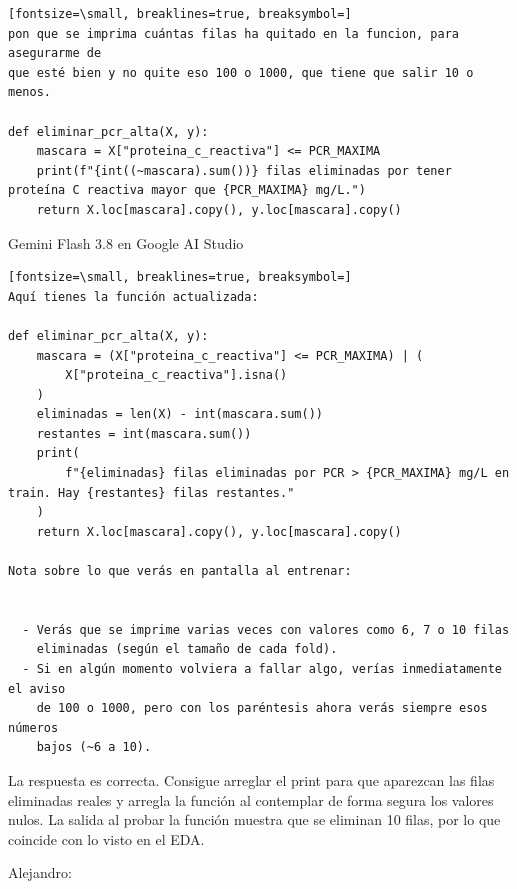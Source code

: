 \documentclass[12pt,a4paper,oneside]{book}
\begin{document}
\begin{iaprompt}
\begin{Verbatim}[fontsize=\small, breaklines=true, breaksymbol=]
pon que se imprima cuántas filas ha quitado en la funcion, para asegurarme de
que esté bien y no quite eso 100 o 1000, que tiene que salir 10 o menos.

def eliminar_pcr_alta(X, y):
    mascara = X["proteina_c_reactiva"] <= PCR_MAXIMA
    print(f"{int((~mascara).sum())} filas eliminadas por tener proteína C reactiva mayor que {PCR_MAXIMA} mg/L.")
    return X.loc[mascara].copy(), y.loc[mascara].copy()
\end{Verbatim}
\end{iaprompt}
\begin{iaresp}{Gemini Flash 3.8 en Google AI Studio}
\begin{Verbatim}[fontsize=\small, breaklines=true, breaksymbol=]
Aquí tienes la función actualizada:

def eliminar_pcr_alta(X, y):
    mascara = (X["proteina_c_reactiva"] <= PCR_MAXIMA) | (
        X["proteina_c_reactiva"].isna()
    )
    eliminadas = len(X) - int(mascara.sum())
    restantes = int(mascara.sum())
    print(
        f"{eliminadas} filas eliminadas por PCR > {PCR_MAXIMA} mg/L en train. Hay {restantes} filas restantes."
    )
    return X.loc[mascara].copy(), y.loc[mascara].copy()

Nota sobre lo que verás en pantalla al entrenar:


  - Verás que se imprime varias veces con valores como 6, 7 o 10 filas
    eliminadas (según el tamaño de cada fold).
  - Si en algún momento volviera a fallar algo, verías inmediatamente el aviso
    de 100 o 1000, pero con los paréntesis ahora verás siempre esos números
    bajos (~6 a 10).
\end{Verbatim}
\end{iaresp}
\begin{iaanalisis}
La respuesta es correcta. Consigue arreglar el print para que aparezcan las filas eliminadas  reales y arregla la función al contemplar de forma segura los valores nulos. La salida al probar la función muestra que se eliminan 10 filas, por lo que coincide con lo visto en el EDA.
\end{iaanalisis}









Alejandro:
\end{document}

